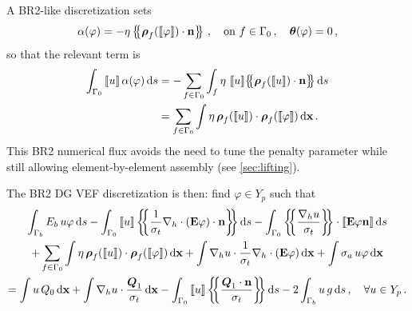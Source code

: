 \documentclass[../doc.tex]{subfiles}
\begin{document}
A BR2-like discretization sets 
	\begin{equation}
		\alpha(\varphi) = -\eta\left\{\!\!\left\{\boldsymbol{\rho}_f(\left\llbracket\varphi \right\rrbracket)\cdot\boldsymbol{\mathrm{n}}\right\}\!\!\right\} \,, \quad \text{on} \ f \in \Gamma_0 \,, \quad \boldsymbol{\theta}(\varphi) = 0 \,,
	\end{equation}
so that the relevant term is 
	\begin{equation}
	\begin{aligned}
		\int_{\Gamma_0} \jump{u} \alpha(\varphi) \ud s &= -\sum_{f\in\Gamma_0}\int_{f} \eta\,\jump{u}\!\avg{\vec{\rho}_f(\jump{u})\cdot\n} \ud s \\
		&= \sum_{f\in\Gamma_0}\int \eta\,\vec{\rho}_f(\jump{u})\cdot\vec{\rho}_f(\jump{\varphi}) \ud \x \,.
	\end{aligned}
	\end{equation}
This BR2 numerical flux avoids the need to tune the penalty parameter while still allowing element-by-element assembly (see \ref{sec:lifting}). 

The BR2 DG VEF discretization is then: find $\varphi \in Y_p$ such that 
	\begin{multline} \label{dgvef:br2}
		\int_{\Gamma_b} E_b\, u \varphi \ud s - \int_{\Gamma_0} \jump{u} \avg{\frac{1}{\sigma_t}\nablah\cdot\paren{\E\varphi}\cdot\n} \ud s - \int_{\Gamma_0} \avg{\frac{\nablah u}{\sigma_t}} \cdot \jump{\E\varphi\n} \ud s \\
		+ \sum_{f\in\Gamma_0} \int \eta\, \vec{\rho}_f(\jump{u}) \cdot \vec{\rho}_f(\jump{\varphi}) \ud \x + \int \nablah u \cdot \frac{1}{\sigma_t}\nablah\cdot\paren{\E\varphi} \ud \x + \int \sigma_a\, u \varphi \ud \x \\ 
		= \int u\, Q_0 \ud \x + \int \nablah u \cdot \frac{\vec{Q}_1}{\sigma_t} \ud \x - \int_{\Gamma_0} \jump{u} \avg{\frac{\vec{Q}_1\cdot\n}{\sigma_t}} \ud s - 2\int_{\Gamma_b} u\, g \ud s \,, \quad \forall u \in Y_p \,. 
	\end{multline}
\end{document}
